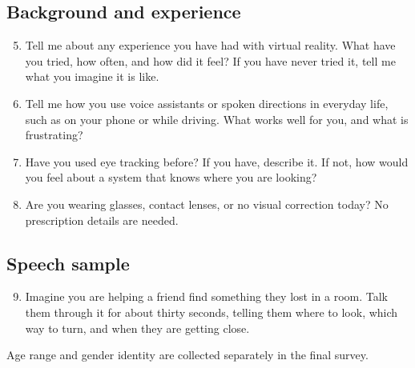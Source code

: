 \subsection*{Background and experience}
\begin{enumerate}\setcounter{enumi}{4}
\item Tell me about any experience you have had with virtual reality. What have you tried, how often, and how did it feel? If you have never tried it, tell me what you imagine it is like.
\par\nopagebreak {}
\item Tell me how you use voice assistants or spoken directions in everyday life, such as on your phone or while driving. What works well for you, and what is frustrating?
\par\nopagebreak {}
\item Have you used eye tracking before? If you have, describe it. If not, how would you feel about a system that knows where you are looking?
\par\nopagebreak {}
\item Are you wearing glasses, contact lenses, or no visual correction today? No prescription details are needed.
\par\nopagebreak {}
\end{enumerate}

\subsection*{Speech sample}
\begin{enumerate}\setcounter{enumi}{8}
\item Imagine you are helping a friend find something they lost in a room. Talk them through it for about thirty seconds, telling them where to look, which way to turn, and when they are getting close.
\end{enumerate}
Age range and gender identity are collected separately in the final survey.

